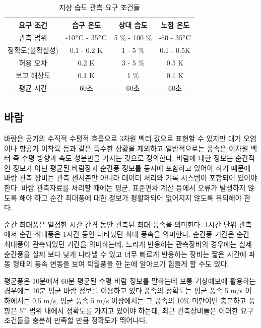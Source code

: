\begin{table}[h]
	\centering
	\caption{지상 습도 관측 요구 조건들}
\begin{tabular}{c|c|c|c}
	\hline 
	요구 조건 & 습구 온도 & 상대 습도 & 노점 온도 \\ 
	\hline 
	관측 범위 & -10$\rm ^{\circ}C$ - 35$\rm ^{\circ}C$ & 5 \% - 100 \% & -60 - 35$\rm ^{\circ}C$   \\ 
	\hline 
	정확도(불확실성) & 0.1 - 0.2 K & 1 - 5 \% & 0.1 - 0.5K \\ 
	\hline 
	허용 오차 & 0.2 K & 3 - 5 \% & 0.5 K \\ 
	\hline 
	보고 해상도 & 0.1 K & 1 \% & 0.1 K \\ 
	\hline 
	평균 시간 & 60초 & 60초 & 60초 \\ 
	\hline 
\end{tabular} 
	\label{table:33}
\end{table}


\subsection{바람}

바람은 공기의 수직적 수평적 흐름으로 3차원 벡터 값으로 표현할 수 있지만 대기 오염이나 항공기 이착륙 등과 같은 특수한 상황을 제외하고 일반적으로는 풍속은 이차원 벡터 즉 수평 방향과 속도 성분만을 가지는 것으로 정의한다.
바람에 대한 정보는 순간적인 정보가 아닌 평균된 바람장과 순간풍 정보를 동시에 포함하고 있어야 하기 때문에 바람 관측 장비는 관측 센서뿐만 아니라 데이터 처리와 기록 시스템이 포함되어 있어야 한다. 바람 관측자료를 처리할 때에는 평균, 표준편차 계산 등에서 오류가 발생하지 않도록 해야 하고 순간 최대풍에 대한 정보가 평활화되어 없어지지 않도록 유의해야 한다. 

순간 최대풍은 일정한 시간 간격 동안 관측된 최대 풍속을 의미한다. 1시간 단위 관측에서 순간 최대풍은 1시간 동안 나타났던 최대 풍속을 의미한다. 순간풍 기간은 순간 최대풍이 관측되었던 기간을 의미하는데, 느리게 반응하는 관측장비의 경우에는 실제 순간풍을 실제 보다 낮게 나타낼 수 있고 너무 빠르게 반응하는 장비는 짧은 시간에 파동 형태의 풍속 변동을 보여 탁월풍을 한 눈에 알아보기 힘들게 할 수도 있다.

평균풍은 10분에서 60분 평균된 수평 바람 정보를 말하는데 보통 기상예보에 활용하는 경우에는 10분 평균 바람 정보를 이용하고 있다.풍속의 정확도는 평균 풍속 5 m/s 이하에서는 0.5 m/s, 평균 풍속 5 m/s 이상에서는 그 풍속의 10\% 미만이면 충분하고 풍향은 5$\rm ^{\circ}$ 범위 내에서 정확도를 가지고 있어야 하는데, 최근 관측장비들은 이러한 요구 조건들을 충분히 만족할 만큼 정확도가 뛰어나다.

